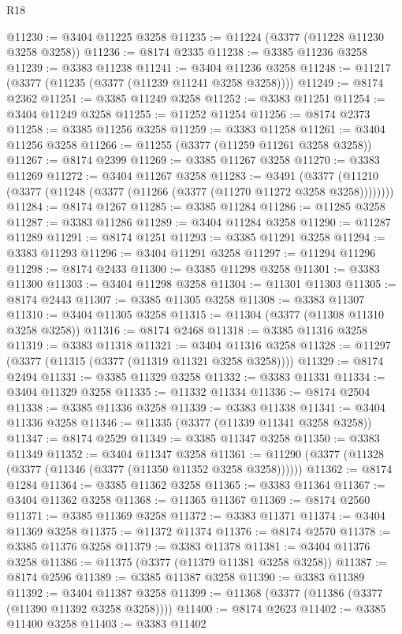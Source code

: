 \begin{lexlean}{R18}
\begin{coremodule}
@11230 := @3404 @11225 @3258
@11235 := @11224 (@3377 (@11228 @11230 @3258 @3258))
@11236 := @8174 @2335
@11238 := @3385 @11236 @3258
@11239 := @3383 @11238
@11241 := @3404 @11236 @3258
@11248 := @11217 (@3377 (@11235 (@3377 (@11239 @11241 @3258 @3258))))
@11249 := @8174 @2362
@11251 := @3385 @11249 @3258
@11252 := @3383 @11251
@11254 := @3404 @11249 @3258
@11255 := @11252 @11254
@11256 := @8174 @2373
@11258 := @3385 @11256 @3258
@11259 := @3383 @11258
@11261 := @3404 @11256 @3258
@11266 := @11255 (@3377 (@11259 @11261 @3258 @3258))
@11267 := @8174 @2399
@11269 := @3385 @11267 @3258
@11270 := @3383 @11269
@11272 := @3404 @11267 @3258
@11283 := @3491
    (@3377 (@11210 (@3377 (@11248 (@3377 (@11266 (@3377 (@11270 @11272 @3258 @3258))))))))
@11284 := @8174 @1267
@11285 := @3385 @11284
@11286 := @11285 @3258
@11287 := @3383 @11286
@11289 := @3404 @11284 @3258
@11290 := @11287 @11289
@11291 := @8174 @1251
@11293 := @3385 @11291 @3258
@11294 := @3383 @11293
@11296 := @3404 @11291 @3258
@11297 := @11294 @11296
@11298 := @8174 @2433
@11300 := @3385 @11298 @3258
@11301 := @3383 @11300
@11303 := @3404 @11298 @3258
@11304 := @11301 @11303
@11305 := @8174 @2443
@11307 := @3385 @11305 @3258
@11308 := @3383 @11307
@11310 := @3404 @11305 @3258
@11315 := @11304 (@3377 (@11308 @11310 @3258 @3258))
@11316 := @8174 @2468
@11318 := @3385 @11316 @3258
@11319 := @3383 @11318
@11321 := @3404 @11316 @3258
@11328 := @11297 (@3377 (@11315 (@3377 (@11319 @11321 @3258 @3258))))
@11329 := @8174 @2494
@11331 := @3385 @11329 @3258
@11332 := @3383 @11331
@11334 := @3404 @11329 @3258
@11335 := @11332 @11334
@11336 := @8174 @2504
@11338 := @3385 @11336 @3258
@11339 := @3383 @11338
@11341 := @3404 @11336 @3258
@11346 := @11335 (@3377 (@11339 @11341 @3258 @3258))
@11347 := @8174 @2529
@11349 := @3385 @11347 @3258
@11350 := @3383 @11349
@11352 := @3404 @11347 @3258
@11361 := @11290 (@3377 (@11328 (@3377 (@11346 (@3377 (@11350 @11352 @3258 @3258))))))
@11362 := @8174 @1284
@11364 := @3385 @11362 @3258
@11365 := @3383 @11364
@11367 := @3404 @11362 @3258
@11368 := @11365 @11367
@11369 := @8174 @2560
@11371 := @3385 @11369 @3258
@11372 := @3383 @11371
@11374 := @3404 @11369 @3258
@11375 := @11372 @11374
@11376 := @8174 @2570
@11378 := @3385 @11376 @3258
@11379 := @3383 @11378
@11381 := @3404 @11376 @3258
@11386 := @11375 (@3377 (@11379 @11381 @3258 @3258))
@11387 := @8174 @2596
@11389 := @3385 @11387 @3258
@11390 := @3383 @11389
@11392 := @3404 @11387 @3258
@11399 := @11368 (@3377 (@11386 (@3377 (@11390 @11392 @3258 @3258))))
@11400 := @8174 @2623
@11402 := @3385 @11400 @3258
@11403 := @3383 @11402

\end{coremodule}
\end{lexlean}
